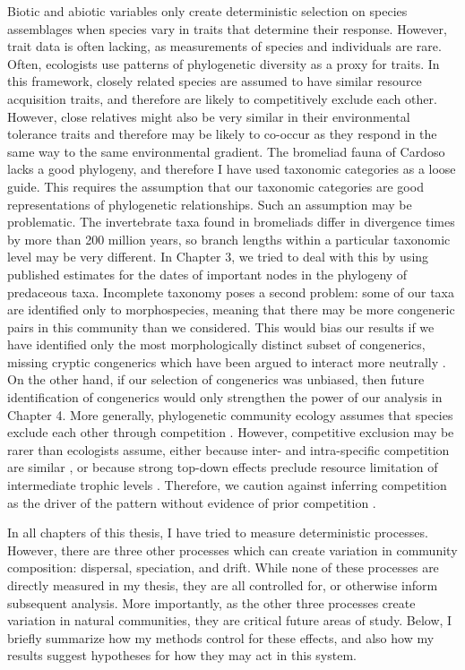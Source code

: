 Biotic and abiotic variables only create deterministic selection on
species assemblages when species vary in traits that determine their
response. However, trait data is often lacking, as measurements of
species and individuals are rare. Often, ecologists use patterns of
phylogenetic diversity as a proxy for traits. In this framework, closely
related species are assumed to have similar resource acquisition traits,
and therefore are likely to competitively exclude each other. However,
close relatives might also be very similar in their environmental
tolerance traits and therefore may be likely to co-occur as they respond
in the same way to the same environmental gradient. The bromeliad fauna
of Cardoso lacks a good phylogeny, and therefore I have used taxonomic
categories as a loose guide. This requires the assumption that our
taxonomic categories are good representations of phylogenetic
relationships. Such an assumption may be problematic. The invertebrate
taxa found in bromeliads differ in divergence times by more than 200
million years, so branch lengths within a particular taxonomic level may
be very different. In Chapter 3, we tried to deal with this by using
published estimates for the dates of important nodes in the phylogeny of
predaceous taxa. Incomplete taxonomy poses a second problem: some of our
taxa are identified only to morphospecies, meaning that there may be
more congeneric pairs in this community than we considered. This would
bias our results if we have identified only the most morphologically
distinct subset of congenerics, missing cryptic congenerics which have
been argued to interact more neutrally \citep{Siepielski2010}. On the
other hand, if our selection of congenerics was unbiased, then future
identification of congenerics would only strengthen the power of our
analysis in Chapter 4. More generally, phylogenetic community ecology
assumes that species exclude each other through competition
\citep{Narwani2015}. However, competitive exclusion may be rarer than
ecologists assume, either because inter- and intra-specific competition
are similar \citep{Hubbell1997}, or because strong top-down effects
preclude resource limitation of intermediate trophic levels
\citep{Holt2004}. Therefore, we caution against inferring competition as
the driver of the pattern without evidence of prior competition
\citep{CahillJr.2008}.

In all chapters of this thesis, I have tried to measure deterministic
processes. However, there are three other processes which can create
variation in community composition: dispersal, speciation, and drift.
While none of these processes are directly measured in my thesis, they
are all controlled for, or otherwise inform subsequent analysis. More
importantly, as the other three processes create variation in natural
communities, they are critical future areas of study. Below, I briefly
summarize how my methods control for these effects, and also how my
results suggest hypotheses for how they may act in this system.

